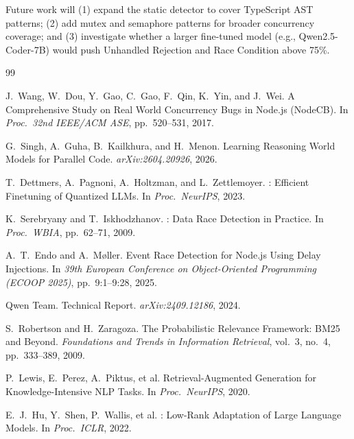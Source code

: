 \documentclass[runningheads]{llncs}
\begin{document}
Future work will (1) expand the static detector to cover TypeScript AST
patterns; (2) add mutex and semaphore patterns for broader concurrency
coverage; and (3) investigate whether a larger fine-tuned model
(e.g., Qwen2.5-Coder-7B) would push Unhandled Rejection and Race Condition
above 75\%.

\begin{thebibliography}{99}

  J.\ Wang, W.\ Dou, Y.\ Gao, C.\ Gao, F.\ Qin, K.\ Yin, and
  J.\ Wei.
  \newblock A Comprehensive Study on Real World Concurrency Bugs in
  {Node.js} ({NodeCB}).
  \newblock In \emph{Proc.\ 32nd IEEE/ACM ASE}, pp.\ 520--531, 2017.

  G.\ Singh, A.\ Guha, B.\ Kailkhura, and H.\ Menon.
  \newblock Learning Reasoning World Models for Parallel Code.
  \newblock \emph{arXiv:2604.20926}, 2026.

  T.\ Dettmers, A.\ Pagnoni, A.\ Holtzman, and L.\ Zettlemoyer.
  : Efficient Finetuning of Quantized LLMs.
  \newblock In \emph{Proc.\ NeurIPS}, 2023.

  K.\ Serebryany and T.\ Iskhodzhanov.
  : Data Race Detection in Practice.
  \newblock In \emph{Proc.\ WBIA}, pp.\ 62--71, 2009.

  A.\ T.\ Endo and A.\ M{\o}ller.
  \newblock Event Race Detection for {Node.js} Using Delay Injections.
  \newblock In \emph{39th European Conference on Object-Oriented Programming (ECOOP 2025)}, pp.\ 9:1--9:28, 2025.

  Qwen Team.
   Technical Report.
  \newblock \emph{arXiv:2409.12186}, 2024.

  S.\ Robertson and H.\ Zaragoza.
  \newblock The Probabilistic Relevance Framework: BM25 and Beyond.
  \newblock \emph{Foundations and Trends in Information Retrieval},
  vol.\ 3, no.\ 4, pp.\ 333--389, 2009.

  P.\ Lewis, E.\ Perez, A.\ Piktus, et al.
  \newblock Retrieval-Augmented Generation for Knowledge-Intensive NLP Tasks.
  \newblock In \emph{Proc.\ NeurIPS}, 2020.

  E.\ J.\ Hu, Y.\ Shen, P.\ Wallis, et al.
  : Low-Rank Adaptation of Large Language Models.
  \newblock In \emph{Proc.\ ICLR}, 2022.


\end{thebibliography}
\end{document}
